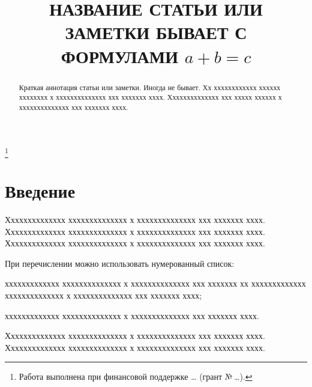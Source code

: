 \documentclass[12pt]{a&t}
\begin{document}

\title{НАЗВАНИЕ СТАТЬИ ИЛИ ЗАМЕТКИ БЫВАЕТ С ФОРМУЛАМИ $a+b=c$}%
\thanks{Работа выполнена при финансовой поддержке \dots
(грант \mbox{№\,\dots}).}


\maketitle

\begin{abstract}
Краткая аннотация статьи или заметки. Иногда не бывает. Хх
хххххххххххх хххххх хххххххх х хххххххххххххх ххх ххххххх хххх.
Хххххххххххххх ххх ххххх хххххх х хххххххххххххх ххх ххххххх
хххх.
\end{abstract}


\section{Введение}

Хххххххххххххх хххххххххххххх х хххххххххххххх ххх ххххххх хххх.
Хххххххххххххх хххххххххххххх х хххххххххххххх ххх ххххххх хххх.
Хххххххххххххх хххххххххххххх х хххххххххххххх ххх ххххххх хххх.

При перечислении можно использовать нумерованный список:
\begin{enumlist} %
\item
ххххххххххххх хххххххххххххх х хххххххххххххх ххх ххххххх хх
ххххххххххххх хххххххххххххх х хххххххххххххх ххх ххххххх хххх;

\item
ххххххххххххх хххххххххххххх х хххххххххххххх ххх ххххххх хххх.
\end{enumlist}

Хххххххххххххх хххххххххххххх х хххххххххххххх ххх ххххххх хххх.
Хххххххххххххх хххххххххххххх х хххххххххххххх ххх ххххххх хххх.
\end{document}
